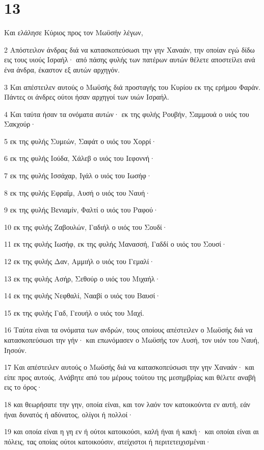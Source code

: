 \chapter{13}

\par Και ελάλησε Κύριος προς τον Μωϋσήν λέγων,
\par 2 Απόστειλον άνδρας διά να κατασκοπεύσωσι την γην Χαναάν, την οποίαν εγώ δίδω εις τους υιούς Ισραήλ· από πάσης φυλής των πατέρων αυτών θέλετε αποστείλει ανά ένα άνδρα, έκαστον εξ αυτών αρχηγόν.
\par 3 Και απέστειλεν αυτούς ο Μωϋσής διά προσταγής του Κυρίου εκ της ερήμου Φαράν. Πάντες οι άνδρες ούτοι ήσαν αρχηγοί των υιών Ισραήλ.
\par 4 Και ταύτα ήσαν τα ονόματα αυτών· εκ της φυλής Ρουβήν, Σαμμουά ο υιός του Σακχούρ·
\par 5 εκ της φυλής Συμεών, Σαφάτ ο υιός του Χορρί·
\par 6 εκ της φυλής Ιούδα, Χάλεβ ο υιός του Ιεφοννή·
\par 7 εκ της φυλής Ισσάχαρ, Ιγάλ ο υιός του Ιωσήφ·
\par 8 εκ της φυλής Εφραΐμ, Αυσή ο υιός του Ναυή·
\par 9 εκ της φυλής Βενιαμίν, Φαλτί ο υιός του Ραφού·
\par 10 εκ της φυλής Ζαβουλών, Γαδιήλ ο υιός του Σουδί·
\par 11 εκ της φυλής Ιωσήφ, εκ της φυλής Μανασσή, Γαδδί ο υιός του Σουσί·
\par 12 εκ της φυλής Δαν, Αμμιήλ ο υιός του Γεμαλί·
\par 13 εκ της φυλής Ασήρ, Σεθούρ ο υιός του Μιχαήλ·
\par 14 εκ της φυλής Νεφθαλί, Νααβί ο υιός του Βαυσί·
\par 15 εκ της φυλής Γαδ, Γεουήλ ο υιός του Μαχί.
\par 16 Ταύτα είναι τα ονόματα των ανδρών, τους οποίους απέστειλεν ο Μωϋσής διά να κατασκοπεύσωσι την γήν· και επωνόμασεν ο Μωϋσής τον Αυσή, τον υιόν του Ναυή, Ιησούν.
\par 17 Και απέστειλεν αυτούς ο Μωϋσής διά να κατασκοπεύσωσι την γην Χαναάν· και είπε προς αυτούς, Ανάβητε από του μέρους τούτου της μεσημβρίας και θέλετε αναβή εις το όρος·
\par 18 και θεωρήσατε την γην, οποία είναι, και τον λαόν τον κατοικούντα εν αυτή, εάν ήναι δυνατός ή αδύνατος, ολίγοι ή πολλοί·
\par 19 και οποία είναι η γη εν ή ούτοι κατοικούσι, καλή ήναι ή κακή· και οποίαι είναι αι πόλεις, τας οποίας ούτοι κατοικούσιν, ατείχιστοι ή περιτετειχισμέναι·

